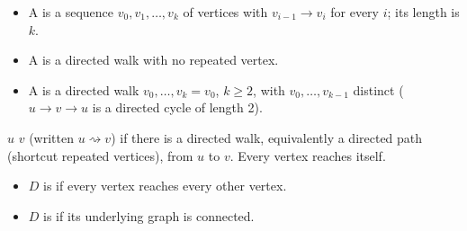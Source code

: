 \documentclass[8pt,a4paper,landscape]{extarticle}
\begin{document}
\begin{cscolumns}
\begin{definition}
\begin{itemize}
\item A  is a sequence $v_0,v_1,\dots,v_k$ of vertices with $v_{i-1}\to v_i$ for every $i$; its length is $k$.
\item A  is a directed walk with no repeated vertex.
\item A  is a directed walk $v_0,\dots,v_k=v_0$, $k\ge 2$, with $v_0,\dots,v_{k-1}$ distinct ($u\to v\to u$ is a directed cycle of length 2).
\end{itemize}
\end{definition}
\begin{definition}[Reachability]
$u$  $v$ (written $u\rightsquigarrow v$) if there is a directed walk, equivalently a directed path (shortcut repeated vertices), from $u$ to $v$. Every vertex reaches itself.
\begin{itemize}
\item $D$ is  if every vertex reaches every other vertex.
\item $D$ is  if its underlying graph is connected.
\end{itemize}
\end{definition}


\end{cscolumns}
\end{document}
